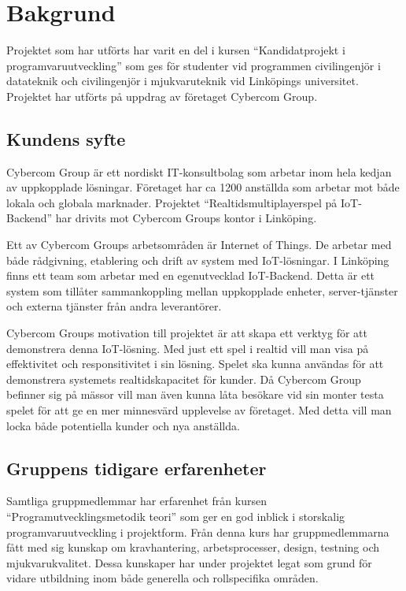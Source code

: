 \chapter{Bakgrund}
\label{cha:background}
Projektet som har utförts har varit en del i kursen ``Kandidatprojekt i programvaruutveckling'' som ges för studenter vid programmen civilingenjör i datateknik och civilingenjör i mjukvaruteknik vid Linköpings universitet.\cite{tddd96} Projektet har utförts på uppdrag av företaget Cybercom Group.

\section{Kundens syfte}
\label{sec:customer-aim}
Cybercom Group är ett nordiskt IT-konsultbolag som arbetar inom hela kedjan av uppkopplade lösningar. Företaget har ca 1200 anställda som arbetar mot både lokala och globala marknader.\cite{cybercomgroup} Projektet ``Realtidsmultiplayerspel på IoT-Backend'' har drivits mot Cybercom Groups kontor i Linköping.

Ett av Cybercom Groups arbetsområden är Internet of Things. De arbetar med både rådgivning, etablering och drift av system med IoT-lösningar.\cite{cybercomiot} I Linköping finns ett team som arbetar med en egenutvecklad IoT-Backend. Detta är ett system som tillåter sammankoppling mellan uppkopplade enheter, server-tjänster och externa tjänster från andra leverantörer.

Cybercom Groups motivation till projektet är att skapa ett verktyg för att demonstrera denna IoT-lösning. Med just ett spel i realtid vill man visa på effektivitet och responsitivitet i sin lösning. Spelet ska kunna användas för att demonstrera systemets realtidskapacitet för kunder. Då Cybercom Group befinner sig på mässor vill man även kunna låta besökare vid sin monter testa spelet för att ge en mer minnesvärd upplevelse av företaget. Med detta vill man locka både potentiella kunder och nya anställda.

\section{Gruppens tidigare erfarenheter}
\label{sec:earlier-experience}
Samtliga gruppmedlemmar har erfarenhet från kursen ``Programutvecklingsmetodik teori'' som ger en god inblick i storskalig programvaruutveckling i projektform. Från denna kurs har gruppmedlemmarna fått med sig kunskap om kravhantering, arbetsprocesser, design, testning och mjukvarukvalitet.\cite{tddc93} Dessa kunskaper har under projektet legat som grund för vidare utbildning inom både generella och rollspecifika områden.

